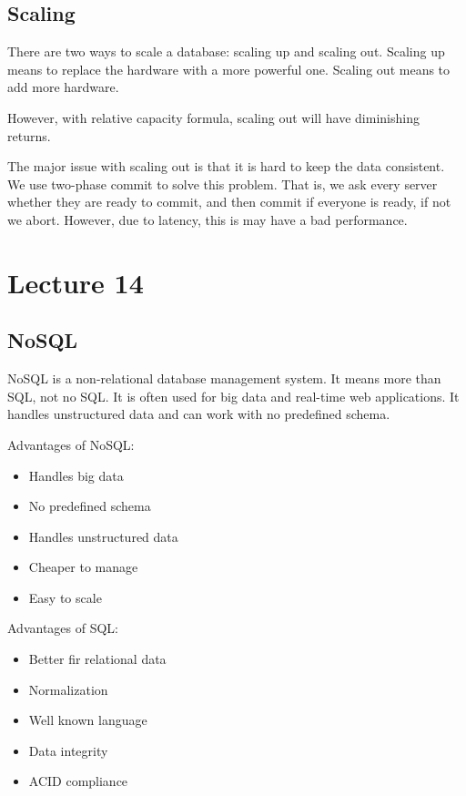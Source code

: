 \documentclass[a4paper,12pt]{article}
\begin{document}
\subsection{Scaling}

There are two ways to scale a database: scaling up and scaling out.
Scaling up means to replace the hardware with a more powerful one.
Scaling out means to add more hardware.

However, with relative capacity formula, scaling out will have diminishing returns.

The major issue with scaling out is that it is hard to keep the data consistent.
We use two-phase commit to solve this problem.
That is, we ask every server whether they are ready to commit, and then commit if everyone is ready, if not we abort.
However, due to latency, this is may have a bad performance.

\section{Lecture 14}

\subsection{NoSQL}

NoSQL is a non-relational database management system.
It means more than SQL, not no SQL.
It is often used for big data and real-time web applications.
It handles unstructured data and can work with no predefined schema.

Advantages of NoSQL:
\begin{itemize}
	\item Handles big data
	\item No predefined schema
	\item Handles unstructured data
	\item Cheaper to manage
	\item Easy to scale
\end{itemize}

Advantages of SQL:
\begin{itemize}
	\item Better fir relational data
	\item Normalization
	\item Well known language
	\item Data integrity
	\item ACID compliance
\end{itemize}
\end{document}
